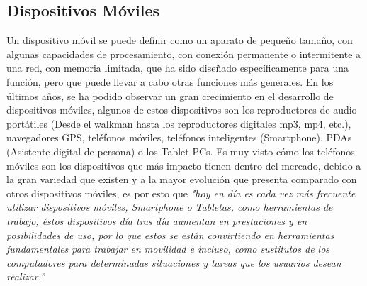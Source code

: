 \documentclass[12pt,letterpaper,openany]{book}
\begin{document}
\subsection{Dispositivos Móviles}
Un dispositivo móvil se puede definir como un aparato de pequeño tamaño, con algunas capacidades de procesamiento, con conexión permanente o intermitente a una red, con memoria limitada, que ha sido diseñado específicamente para una función, pero que puede llevar a cabo otras funciones más generales\cite{10}.
\vspace{5mm}\newline
En los últimos años, se ha podido observar un gran crecimiento en el desarrollo de dispositivos móviles, algunos de estos dispositivos son los reproductores de audio portátiles (Desde el walkman hasta los reproductores digitales mp3, mp4, etc.), navegadores GPS, teléfonos móviles, teléfonos inteligentes (Smartphone), PDAs (Asistente digital de persona) o los Tablet PCs.
\vspace{5mm}\newline
Es muy visto cómo los teléfonos móviles son los dispositivos que más impacto tienen dentro del mercado, debido a la gran variedad que existen y a la mayor evolución que presenta comparado con otros dispositivos móviles, es por esto que \textit{"hoy en día es cada vez más frecuente utilizar dispositivos móviles, Smartphone o Tabletas, como herramientas de trabajo, éstos dispositivos día tras día aumentan en prestaciones y en posibilidades de uso, por lo que estos se están convirtiendo en herramientas fundamentales para trabajar en movilidad e incluso, como sustitutos de los computadores para determinadas situaciones y tareas que los usuarios desean realizar.”} \cite{11} 
\end{document}
